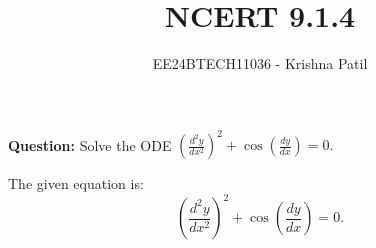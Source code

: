 \documentclass[journal]{IEEEtran}
\begin{document}

\vspace{3cm}

\title{NCERT 9.1.4}
\author{EE24BTECH11036 - Krishna Patil}

{\let\newpage\relax\maketitle}

\renewcommand{\thefigure}{\theenumi}
\renewcommand{\thetable}{\theenumi}
\setlength{\intextsep}{10pt} %


\textbf{Question:} Solve the ODE \((\frac{d^2y}{dx^2})^2 + \cos\left(\frac{dy}{dx}\right) = 0.\)

\solution
The given equation is:
\[
\left(\frac{d^2y}{dx^2}\right)^2 + \cos\left(\frac{dy}{dx}\right) = 0.
\]
\end{document}
